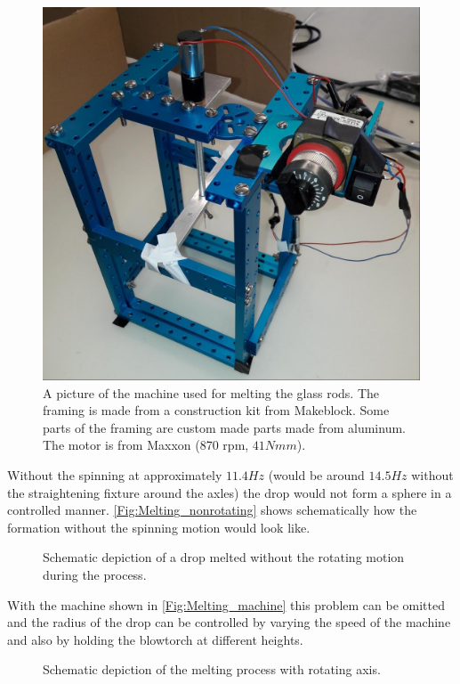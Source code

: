\begin{figure}[H]
	\includegraphics[scale=0.2]{source/melting_machine}
	\caption{A picture of the machine used for melting the glass rods. The framing is made from a construction kit from Makeblock. Some parts of the framing are custom made parts made from aluminum. The motor is from Maxxon (870 rpm, $41 \si{Nmm}$).}
	\label{Fig:Melting_machine}
\end{figure}
Without the spinning at approximately $11.4\si{Hz}$ (would be around $14.5\si{Hz}$ without the straightening fixture around the axles) the drop would not form a sphere in a controlled manner. \autoref{Fig:Melting_nonrotating} shows schematically how the formation without the spinning motion would look like.
\begin{figure}[H]
	
	\caption{Schematic depiction of a drop melted without the rotating motion during the process.}
	\label{Fig:Melting_nonrotating}
\end{figure}
With the machine shown in \autoref{Fig:Melting_machine} this problem can be omitted and the radius of the drop can be controlled by varying the speed of the machine and also by holding the blowtorch at different heights.
\begin{figure}[H]
	
	\caption{Schematic depiction of the melting process with rotating axis.}
\end{figure}
